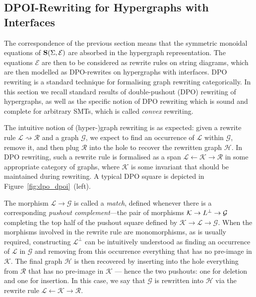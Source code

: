\subsection{DPOI-Rewriting for Hypergraphs with Interfaces}
The correspondence of the previous section means that the symmetric monoidal equations of $\mathbf{S}(\Sigma, \mathcal{E})$ are absorbed in the hypergraph representation.  The equations $\mathcal{E}$ are then to be considered as rewrite rules on string diagrams,  which are then modelled as DPO-rewrites on hypergraphs with interfaces. 
DPO rewriting is a standard technique for formalising graph rewriting categorically. 
In this section we recall standard results of double-pushout (DPO) rewriting of hypergraphs,  as well as the specific notion of DPO rewriting which is sound and complete for arbitrary SMTs,  which is called \textit{convex} rewriting. 

The intuitive notion of (hyper-)graph rewriting is  as expected: given a rewrite rule $\mathcal L \rightsquigarrow \mathcal R$ and a graph $\mathcal{G}$,  we expect to find an occurrence of $\mathcal L$ within $\mathcal{G}$,  remove it,  and then plug $\mathcal R$ into the hole to recover the rewritten graph $\mathcal{H}$.  In DPO rewriting,  such a rewrite rule is formalised as a span $\mathcal L \xleftarrow{} \mathcal K \xrightarrow{} \mathcal R$ in some appropriate category of graphs,  where $\mathcal K$ is some invariant that should be maintained during rewriting.
A typical DPO square is depicted in Figure~\ref{fig:dpo_dpoi}~(left).


The morphism $\mathcal L \to \mathcal G$ is called a \textit{match},  defined whenever there is a corresponding \textit{pushout complement}---the pair of morphisms $\mathcal K \to \mathcal \mathcal{L}^{\bot} \to \mathcal G$ completing the top half of the pushout square defined by $\mathcal K \xrightarrow{} \mathcal L \xrightarrow{} \mathcal G$. 
When the morphisms involved in the rewrite rule are monomorphisms,  as is usually required,  constructing $\mathcal{L}^{\bot}$ can be intuitively understood as finding an occurrence of $\mathcal L$ in $\mathcal G$ and removing from this occurrence everything that has no pre-image in $\mathcal K$.  The final graph $\mathcal H$ is then recovered by inserting into the hole everything from $\mathcal R$ that has no pre-image in $\mathcal K$ --- hence the two pushouts: one for deletion and one for insertion.  In this case,  we say that $\mathcal G$ is rewritten into $\mathcal H$ via the rewrite rule $\mathcal L \xleftarrow{} \mathcal K \xrightarrow{} \mathcal R$.

